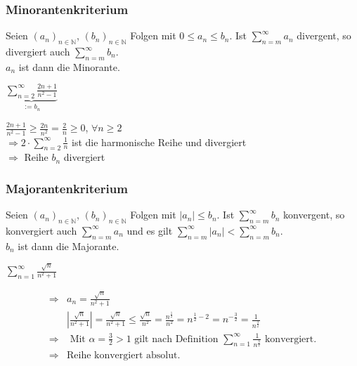 \documentclass[a4paper,12pt]{article}
\begin{document}
	\subsubsection{Minorantenkriterium}
	\begin{defi}
		Seien $\left(a_n\right)_{n \in \mathbb{N}}$, $\left(b_n\right)_{n \in \mathbb{N}}$ Folgen mit $0 \leq a_n \leq b_n$. Ist $\sum_{n=m}^{\infty} a_n$ divergent, so divergiert auch $\sum_{n=m}^{\infty} b_n$.\\
		$a_n$ ist dann die Minorante.
	\end{defi}
	\begin{bsp}
		\begin{center}
			$\underbrace{\sum_{n=2}^{\infty} \frac{2n+1}{n^2-1}}_{:= b_n}$ 
		\end{center}
		\begin{center}
			$\frac{2n+1}{n^2-1} \geq \frac{2n}{n^2} = \frac{2}{n} \geq 0$, $\forall n \geq 2$\\
			$\Rightarrow 2 \cdot \sum_{n=2}^{\infty} \frac{1}{n}$ ist die harmonische Reihe und divergiert\\
			$\Rightarrow$ Reihe $b_n$ divergiert
		\end{center}
	\end{bsp}
	\newpage
	
	\subsubsection{Majorantenkriterium}
	\begin{defi}
		Seien $\left(a_n\right)_{n \in \mathbb{N}}$, $\left(b_n\right)_{n \in \mathbb{N}}$ Folgen mit $\left|a_n\right| \leq b_n$. Ist $\sum_{n=m}^{\infty} b_n$ konvergent, so konvergiert auch $\sum_{n=m}^{\infty} a_n$ und es gilt $\sum_{n=m}^{\infty} \left|a_n\right| < \sum_{n=m}^{\infty} b_n$.\\
		$b_n$ ist dann die Majorante.
	\end{defi}
	\begin{bsp}
		\begin{center}
			$\sum_{n=1}^{\infty} \frac{\sqrt{n}}{n^2+1}$
		\end{center}
		\begin{align*}
			\Rightarrow &a_n = \frac{\sqrt{n}}{n^2+1}\\
			&\left| \frac{\sqrt{n}}{n^2+1} \right| =  \frac{\sqrt{n}}{n^2+1} \leq \frac{\sqrt{n}}{n^2} = \frac{n^{\frac{1}{2}}}{n^2} = n^{\frac{1}{2}-2} = n^{-\frac{3}{2}} = \frac{1}{n^{\frac{3}{2}}}\\
			\Rightarrow &\text{ Mit } \alpha = \frac{3}{2} > 1 \text{ gilt nach Definition } \sum_{n=1}^{\infty} \frac{1}{n^{\frac{3}{2}}} \text{ konvergiert.}\\
			\Rightarrow &\text{Reihe konvergiert absolut.}
		\end{align*}
	\end{bsp}
\end{document}
